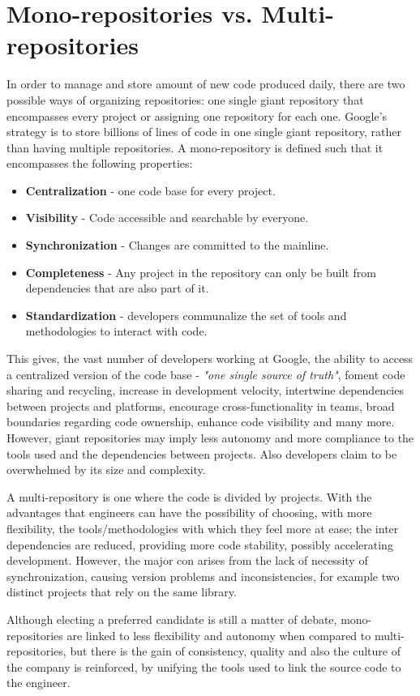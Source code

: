
\section{Mono-repositories vs. Multi-repositories}

In order to manage and store amount of new code produced daily, there are two possible ways of organizing repositories: one single giant repository that encompasses every project or assigning one repository for each one. Google's strategy is to store billions of lines of code in one single giant repository, rather than having multiple repositories. \cite{Potvin:2016:WGS:2963119.2854146}
A mono-repository is defined such that it encompasses the following properties: 
\begin{itemize}
	\item \textbf{Centralization} - one code base for every project.
	\item \textbf{Visibility} - Code accessible and searchable by everyone.
	\item \textbf{Synchronization} - Changes are committed  to the mainline.
	\item \textbf{Completeness} - Any project in the repository can only be built from dependencies that are also part of it. 
	\item \textbf{Standardization} - developers communalize the set of tools and methodologies to interact with code.
\end{itemize}

This gives, the vast number of developers working at Google, the ability to access a centralized version of the code base - \textit{"one single source of truth"}, foment code sharing and recycling, increase in development velocity,  intertwine dependencies between projects and platforms, encourage cross-functionality in teams, broad boundaries regarding code ownership, enhance code visibility and many more. However, giant repositories may imply less autonomy and more compliance to the tools used and the dependencies between projects. Also developers claim to be overwhelmed by its size and complexity.
\par A multi-repository is one where the code is divided by projects. With the advantages that engineers can have the possibility of choosing, with more flexibility, the tools/methodologies with which they feel more at ease; the inter dependencies are reduced, providing more code stability, possibly accelerating development. However, the major con arises from the lack of necessity of synchronization, causing version problems and inconsistencies, for example two distinct projects that rely on the same library.
\par Although electing a preferred candidate is still a matter of debate, mono-repositories are linked to less flexibility and autonomy when compared to multi-repositories, but there is the gain of consistency, quality and also the culture of the company is reinforced, by unifying the tools used to link the source code to the engineer.\cite{Jaspan:2018:ADM:3183519.3183550}


